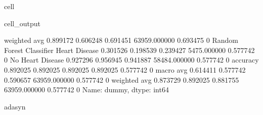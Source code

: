 \documentclass[letterpaper,10pt,english]{jupyterBook}
\begin{document}
\begin{sphinxuseclass}{cell}
\begin{sphinxVerbatimOutput}
\begin{sphinxuseclass}{cell_output}
\begin{sphinxVerbatim}[commandchars=\\\{\}]
                           weighted avg      0.899172   0.606248  0.691451  63959.000000  0.693475    0
Random Forest Classifier   Heart Disease     0.301526   0.198539  0.239427  5475.000000   0.577742    0
                           No Heart Disease  0.927296   0.956945  0.941887  58484.000000  0.577742    0
                           accuracy          0.892025   0.892025  0.892025  0.892025      0.577742    0
                           macro avg         0.614411   0.577742  0.590657  63959.000000  0.577742    0
                           weighted avg      0.873729   0.892025  0.881755  63959.000000  0.577742    0
Name: dummy, dtype: int64

adasyn
\PYGZhy{}\PYGZhy{}\PYGZhy{}\PYGZhy{}\PYGZhy{}\PYGZhy{}\PYGZhy{}\PYGZhy{}\PYGZhy{}\PYGZhy{}\PYGZhy{}\PYGZhy{}\PYGZhy{}\PYGZhy{}\PYGZhy{}\PYGZhy{}\PYGZhy{}\PYGZhy{}\PYGZhy{}
\end{sphinxVerbatim}

\noindent{}


\end{sphinxuseclass}
\end{sphinxVerbatimOutput}
\end{sphinxuseclass}
\end{document}
